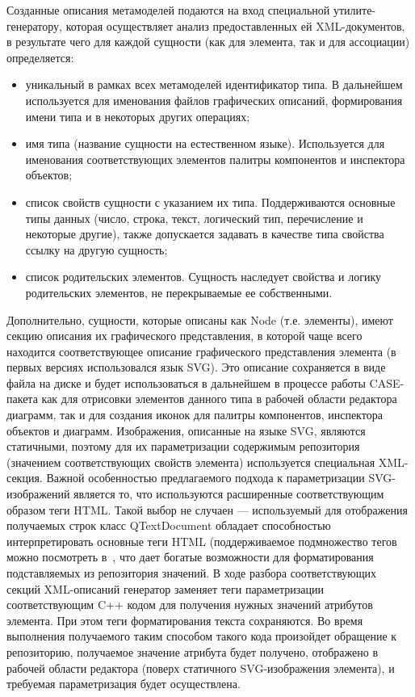 \documentclass[a5paper]{article}
\begin{document}
Созданные описания метамоделей подаются на вход специальной
утилите-генератору, которая осуществляет анализ предоставленных ей
XML-документов, в результате чего для
каждой сущности (как для элемента, так и для ассоциации) определяется:

\begin{itemize}
  \item уникальный в рамках всех метамоделей идентификатор типа. В дальнейшем
	используется для именования файлов графических описаний, формирования
	имени типа и в некоторых других операциях;
  \item имя типа (название сущности на естественном языке). Используется для
	именования соответствующих элементов палитры компонентов и инспектора
	объектов;
  \item список свойств сущности с указанием их типа. Поддерживаются основные
	типы данных (число, строка, текст, логический тип, перечисление и
	некоторые другие), также допускается задавать в качестве типа свойства
	ссылку на другую сущность;
  \item список родительских элементов. Сущность наследует свойства и логику
	родительских элементов, не перекрываемые ее собственными.
\end{itemize}

Дополнительно, сущности, которые описаны как
Node (т.е. элементы), имеют секцию описания
их графического представления, в которой чаще всего находится
соответствующее описание графического представления элемента (в первых
версиях использовался язык SVG). Это
описание сохраняется в виде файла на диске и будет использоваться в
дальнейшем в процессе работы CASE-пакета
как для отрисовки элементов данного типа в рабочей области редактора
диаграмм, так и для создания иконок для палитры компонентов, инспектора
объектов и диаграмм. Изображения, описанные на языке SVG, являются статичными, поэтому для их
параметризации содержимым репозитория (значением соответствующих
свойств элемента) используется специальная
XML-секция. Важной особенностью предлагаемого подхода к параметризации
SVG-изображений является то, что используются расширенные соответствующим образом теги
HTML. Такой выбор не случаен --- используемый
для отображения получаемых строк класс QTextDocument обладает способностью
интерпретировать основные теги HTML
(поддерживаемое подмножество тегов можно посмотреть в~\cite{htmlInQt}, что дает
богатые возможности для форматирования подставляемых из репозитория
значений. В ходе разбора соответствующих секций XML-описаний генератор заменяет теги
параметризации соответствующим C++ кодом для
получения нужных значений атрибутов элемента. При этом теги
форматирования текста сохраняются. Во время выполнения получаемого
таким способом такого кода произойдет обращение к репозиторию,
получаемое значение атрибута будет получено, отображено в рабочей
области редактора (поверх статичного SVG-изображения элемента), и требуемая
параметризация будет осуществлена.
\end{document}
